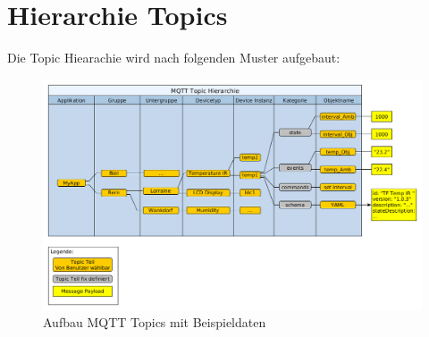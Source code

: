 \section{Hierarchie Topics}


Die Topic Hiearachie wird nach folgenden Muster aufgebaut:

\begin{figure}[H]
	\centering
		\includegraphics[width=1.0\textwidth]{diag/topic_hierarchy.png}
	\caption{\label{fig:tempitTopics}Aufbau MQTT Topics mit Beispieldaten}
\end{figure}


